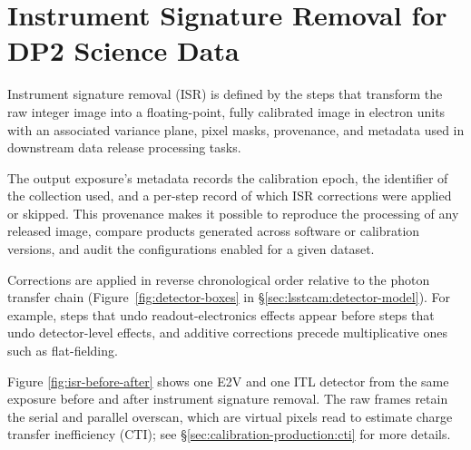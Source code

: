 \section{Instrument Signature Removal for DP2 Science Data} \label{sec:isr-science}

Instrument signature removal (ISR) is defined by the steps that transform the raw integer image into a floating-point, fully calibrated image in electron units with an associated variance plane, pixel masks, provenance, and metadata used in downstream data release processing tasks.

The output exposure's metadata records the calibration epoch, the identifier of the collection used, and a per-step record of which ISR corrections were applied or skipped.
This provenance makes it possible to reproduce the processing of any released image, compare products generated across software or calibration versions, and audit the configurations enabled for a given dataset.

Corrections are applied in reverse chronological order relative to the photon transfer chain (Figure~\ref{fig:detector-boxes} in \S\ref{sec:lsstcam:detector-model}).
For example, steps that undo readout-electronics effects appear before steps that undo detector-level effects, and additive corrections precede multiplicative ones such as flat-fielding.

Figure \ref{fig:isr-before-after} shows one E2V and one ITL detector from the same exposure before and after instrument signature removal.
The raw frames retain the serial and parallel overscan, which are virtual pixels read to estimate charge transfer inefficiency (CTI); see \S\ref{sec:calibration-production:cti} for more details.

